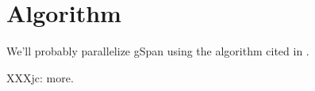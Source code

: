 \section{Algorithm}

We'll probably parallelize gSpan using the algorithm cited in \cite{gspancuda}.

XXXjc: more.
